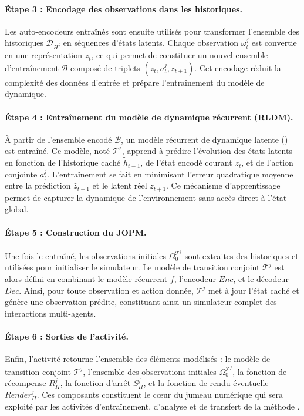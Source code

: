\paragraph{Étape 3 : Encodage des observations dans les historiques.}
Les auto-encodeurs entraînés sont ensuite utilisés pour transformer l’ensemble des historiques $\mathcal{D}_{H^j}$ en séquences d’états latents.
Chaque observation $\omega_t^j$ est convertie en une représentation $z_t$, ce qui permet de constituer un nouvel ensemble d’entraînement $\mathcal{B}$ composé de triplets $(z_t, a_t^j, z_{t+1})$.
Cet encodage réduit la complexité des données d’entrée et prépare l’entraînement du modèle de dynamique.

\paragraph{Étape 4 : Entraînement du modèle de dynamique récurrent (RLDM).}
À partir de l’ensemble encodé $\mathcal{B}$, un modèle récurrent de dynamique latente () est entraîné.
Ce modèle, noté $\mathcal{T}^z$, apprend à prédire l’évolution des états latents en fonction de l’historique caché $\tilde{h}_{t-1}$, de l’état encodé courant $z_t$, et de l’action conjointe $a_t^j$.
L’entraînement se fait en minimisant l’erreur quadratique moyenne entre la prédiction $\hat{z}_{t+1}$ et le latent réel $z_{t+1}$.
Ce mécanisme d’apprentissage permet de capturer la dynamique de l’environnement sans accès direct à l’état global.

\paragraph{Étape 5 : Construction du JOPM.}
Une fois le  entraîné, les observations initiales $\Omega^{\mathcal{T}^j}_0$ sont extraites des historiques et utilisées pour initialiser le simulateur.
Le modèle de transition conjoint $\mathcal{T}^j$ est alors défini en combinant le modèle récurrent $f$, l’encodeur $Enc$, et le décodeur $Dec$.
Ainsi, pour toute observation et action donnée, $\mathcal{T}^j$ met à jour l’état caché et génère une observation prédite, constituant ainsi un simulateur complet des interactions multi-agents.

\paragraph{Étape 6 : Sorties de l’activité.}
Enfin, l’activité retourne l’ensemble des éléments modélisés : le modèle de transition conjoint $\mathcal{T}^j$, l’ensemble des observations initiales $\Omega^{\mathcal{T}^j}_0$, la fonction de récompense $R^j_H$, la fonction d’arrêt $S^j_H$, et la fonction de rendu éventuelle $Render^j_H$.
Ces composants constituent le cœur du jumeau numérique qui sera exploité par les activités d’entraînement, d’analyse et de transfert de la méthode .


